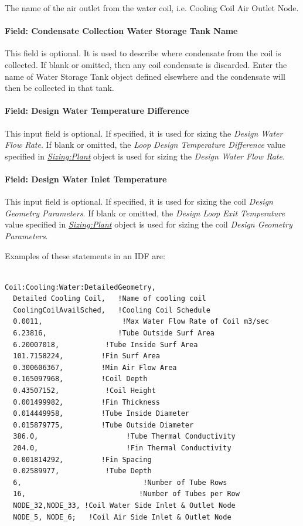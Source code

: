The name of the air outlet from the water coil, i.e. Cooling Coil Air Outlet Node.

\paragraph{Field: Condensate Collection Water Storage Tank Name}\label{field-condensate-collection-water-storage-tank-name-1}

This field is optional. It is used to describe where condensate from the coil is collected. If blank or omitted, then any coil condensate is discarded. Enter the name of Water Storage Tank object defined elsewhere and the condensate will then be collected in that tank.

\paragraph{Field: Design Water Temperature Difference}\label{field-design-water-temperature-difference}

This input field is optional. If specified, it is used for sizing the \textit{Design Water Flow Rate}. If blank or omitted, the \textit{Loop Design Temperature Difference} value specified in \textit{\hyperref[sizingplant]{Sizing:Plant}} object is used for sizing the \textit{Design Water Flow Rate}.

\paragraph{Field: Design Water Inlet Temperature}\label{field-design-water-inlet-temperature}

This input field is optional. If specified, it is used for sizing the coil \textit{Design Geometry Parameters}. If blank or omitted, the \textit{Design Loop Exit Temperature} value specified in \textit{\hyperref[sizingplant]{Sizing:Plant}} object is used for sizing the coil \textit{Design Geometry Parameters}.

Examples of these statements in an IDF are:

\begin{lstlisting}

Coil:Cooling:Water:DetailedGeometry,
  Detailed Cooling Coil,   !Name of cooling coil
  CoolingCoilAvailSched,   !Cooling Coil Schedule
  0.0011,                   !Max Water Flow Rate of Coil m3/sec
  6.23816,                 !Tube Outside Surf Area
  6.20007018,           !Tube Inside Surf Area
  101.7158224,         !Fin Surf Area
  0.300606367,         !Min Air Flow Area
  0.165097968,         !Coil Depth
  0.43507152,           !Coil Height
  0.001499982,         !Fin Thickness
  0.014449958,         !Tube Inside Diameter
  0.015879775,         !Tube Outside Diameter
  386.0,                     !Tube Thermal Conductivity
  204.0,                     !Fin Thermal Conductivity
  0.001814292,         !Fin Spacing
  0.02589977,           !Tube Depth
  6,                             !Number of Tube Rows
  16,                           !Number of Tubes per Row
  NODE_32,NODE_33, !Coil Water Side Inlet & Outlet Node
  NODE_5, NODE_6;   !Coil Air Side Inlet & Outlet Node
\end{lstlisting}

